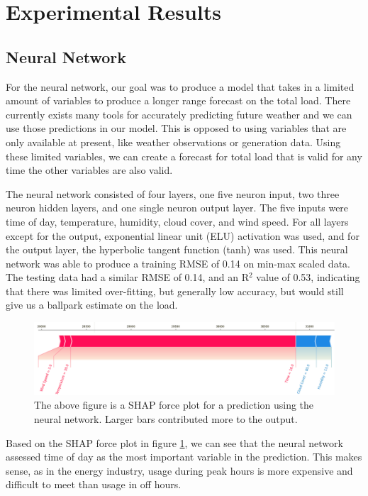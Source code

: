 \documentclass[10pt]{article}
\begin{document}
\section{Experimental Results}\label{sec:5}

\subsection{Neural Network}

For the neural network, our goal was to produce a model that takes in a limited amount of variables to produce a longer range forecast on the total load. There currently exists many tools for accurately predicting future weather and we can use those predictions in our model. This is opposed to using variables that are only available at present, like weather observations or generation data. Using these limited variables, we can create a forecast for total load that is valid for any time the other variables are also valid.

The neural network consisted of four layers, one five neuron input, two three neuron hidden layers, and one single neuron output layer. The five inputs were time of day, temperature, humidity, cloud cover, and wind speed. For all layers except for the output, exponential linear unit (ELU) activation was used, and for the output layer, the hyperbolic tangent function (tanh) was used. This neural network was able to produce a training RMSE of 0.14 on min-max scaled data. The testing data had a similar RMSE of 0.14, and an R$^2$ value of 0.53, indicating that there was limited over-fitting, but generally low accuracy, but would still give us a ballpark estimate on the load.

\begin{figure}[H]
    \centering
    \includegraphics[scale=0.39]{shap_nn.png}
    \caption {The above figure is a SHAP force plot for a prediction using the neural network. Larger bars contributed more to the output.}
    \label{shap_nn}
\end{figure}

Based on the SHAP force plot in figure \ref{shap_nn}, we can see that the neural network assessed time of day as the most important variable in the prediction. This makes sense, as in the energy industry, usage during peak hours is more expensive and difficult to meet than usage in off hours.
\end{document}
